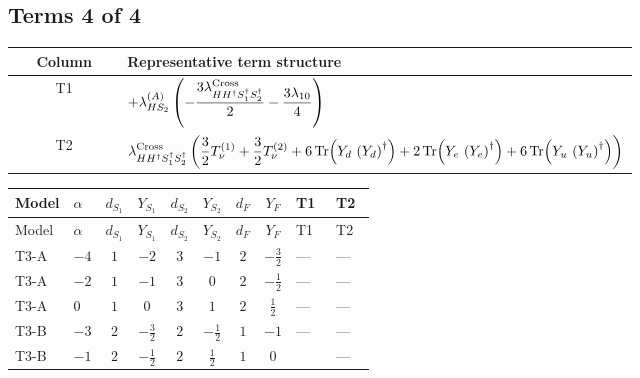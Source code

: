\documentclass[8pt]{article}
\begin{document}
\begin{landscape}
\subsection*{Terms 4 of 4}
\begin{center}
\begin{tabular}{@{}c >{\raggedright\arraybackslash}p{0.82\linewidth}@{}}
\toprule
Column & Representative term structure \\
\midrule
T1 & \(\displaystyle +{\lambda_{HS_2}^{(A)}} \left(-\frac{3 {\lambda_{H H^\dagger S_1^\dagger S_2^\dagger}^{\rm Cross}}}{2}-\frac{3 {\lambda_{10}}}{4}\right)\) \\
\midrule
T2 & \(\displaystyle {\lambda_{H H^\dagger S_1^\dagger S_2^\dagger}^{\rm Cross}} \left(\frac{3}{2} T_{\nu}^{(1)}+\frac{3}{2} T_{\nu}^{(2)}+6 \operatorname{Tr}\!\left({Y_d}\,\left({Y_d}\right)^{\dagger}\right)+2 \operatorname{Tr}\!\left({Y_e}\,\left({Y_e}\right)^{\dagger}\right)+6 \operatorname{Tr}\!\left({Y_u}\,\left({Y_u}\right)^{\dagger}\right)\right)\) \\
\midrule
\bottomrule
\end{tabular}
\end{center}
\smallskip
\tiny
\begin{longtable}{@{}llcccccc >{\raggedright\arraybackslash}p{0.21\linewidth} >{\raggedright\arraybackslash}p{0.21\linewidth}@{}}
\toprule
Model & $\alpha$ & $d_{S_1}$ & $Y_{S_1}$ & $d_{S_2}$ & $Y_{S_2}$ & $d_F$ & $Y_F$ & T1 & T2 \\
\midrule
\endfirsthead
\toprule
Model & $\alpha$ & $d_{S_1}$ & $Y_{S_1}$ & $d_{S_2}$ & $Y_{S_2}$ & $d_F$ & $Y_F$ & T1 & T2 \\
\midrule
\endhead
T3-A & $-4$ & $1$ & $-2$ & $3$ & $-1$ & $2$ & $-\frac{3}{2}$ & --- & --- \\
\midrule
T3-A & $-2$ & $1$ & $-1$ & $3$ & $0$ & $2$ & $-\frac{1}{2}$ & --- & --- \\
\midrule
T3-A & $0$ & $1$ & $0$ & $3$ & $1$ & $2$ & $\frac{1}{2}$ & --- & --- \\
\midrule
T3-B & $-3$ & $2$ & $-\frac{3}{2}$ & $2$ & $-\frac{1}{2}$ & $1$ & $-1$ & --- & --- \\
\midrule
T3-B & $-1$ & $2$ & $-\frac{1}{2}$ & $2$ & $\frac{1}{2}$ & $1$ & $0$ & \scriptsize\adjustbox{max width=\linewidth}{$\begin{gathered} +{\lambda_{HS_2}^{(A)}} \left(-\frac{3 {\lambda_{H H^\dagger S_1^\dagger S_2^\dagger}^{\rm Cross}}}{2}-\frac{3 {\lambda_{10}}}{4}\right)\end{gathered}$} & --- \\

\end{longtable}
\end{landscape}
\end{document}
